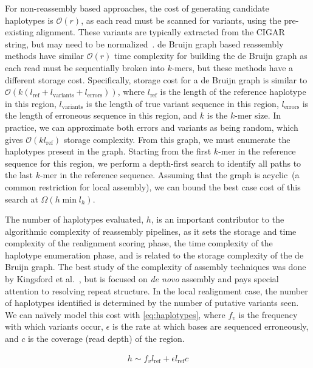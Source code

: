 \documentclass[phd]{ucbthesis}
\begin{document}
For non-reassembly based approaches, the cost of generating candidate haplotypes is $\mathcal{O}(r)$,
as each read must be scanned for variants, using the pre-existing alignment. These variants are typically
extracted from the CIGAR string, but may need to be normalized~\cite{li14}. de Bruijn graph based 
reassembly methods have similar $\mathcal{O}(r)$ time complexity for building the de Bruijn
graph as each read must be sequentially broken into $k$-mers, but these methods have a different
storage cost. Specifically, storage cost for a de Bruijn graph is similar to $\mathcal{O}(k
(l_{\text{ref}} + l_{\text{variants}} + l_{\text{errors}}))$, where $l_{\text{ref}}$ is the length of the reference
haplotype in this region, $l_{\text{variants}}$ is the length of true variant sequence in this region, 
$l_{\text{errors}}$ is the length of erroneous sequence in this region, and $k$ is the $k$-mer size. In
practice, we can approximate both errors and variants as being random, which gives $\mathcal{O}(k
l_{\text{ref}})$ storage complexity. From this graph, we must enumerate the haplotypes present in the
graph. Starting from the first $k$-mer in the reference sequence for this region, we perform a depth-first
search to identify all paths to the last $k$-mer in the reference sequence. Assuming that the graph is
acyclic~(a common restriction for local assembly), we can
bound the best case cost of this search at $\Omega(h \min l_h)$.

The number of haplotypes evaluated, $h$, is an important contributor to the algorithmic complexity of
reassembly pipelines, as it sets the storage and time complexity of the realignment scoring phase, the
time complexity of the haplotype enumeration phase, and is related to the storage complexity of the
de Bruijn graph. The best study of the complexity of assembly techniques was done by Kingsford
et al.~\cite{kingsford10}, but is focused on \emph{de novo} assembly and pays special attention to
resolving repeat structure. In the local realignment case, the number of haplotypes identified is determined
by the number of putative variants seen. We can na\"{i}vely model this cost with \eqref{eq:haplotypes},
where $f_v$ is the frequency with which variants occur, $\epsilon$ is the rate at which bases are
sequenced erroneously, and $c$ is the coverage (read depth) of the region.

\begin{align}
\label{eq:haplotypes}
h \sim f_v l_{\text{ref}} + \epsilon l_{\text{ref}} c
\end{align}
\end{document}
